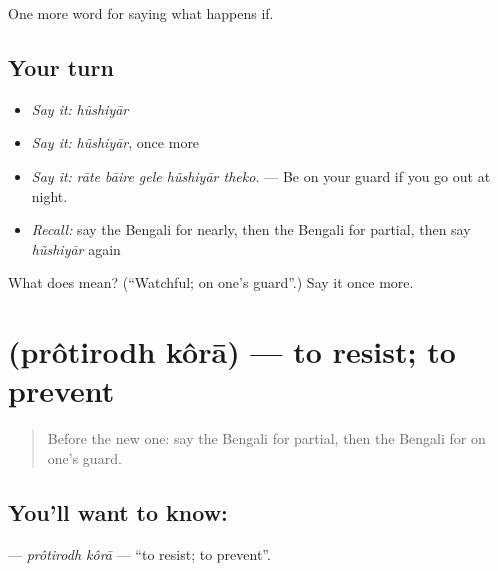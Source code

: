 \begin{grammarlens}[title={What you've built}]
One more word for saying what happens if.
\end{grammarlens}

\subsection*{Your turn}
\begin{itemize}
\raggedright
  \item \emph{Say it:} \emph{hũshiyār}
  \item \emph{Say it:} \emph{hũshiyār}, once more
  \item \emph{Say it:} \emph{rāte bāire gele hũshiyār theko.} — Be on your guard if you go out at night.
  \item \emph{Recall:} say the Bengali for nearly, then the Bengali for partial, then say \emph{hũshiyār} again
\end{itemize}

\begin{tcolorbox}[breakable,colback=teal!4,colframe=teal!35!black,title={Before you move on}]
What does  mean? (\textquotedblleft{}Watchful; on one's guard\textquotedblright{}.) Say it once more.
\end{tcolorbox}
\section[\texorpdfstring{\bn{প্রতিরোধ} \bn{করা} (prôtirodh kôrā)}{প্রতিরোধ করা (prôtirodh kôrā)}]{  (prôtirodh kôrā) — to resist; to prevent}

\label{lesson:BN-C374-protirodh-kora}



\begin{quote}
Before the new one: say the Bengali for partial, then the Bengali for on one's guard.
\end{quote}

\subsection*{You'll want to know:  }
\textbf{ } — \emph{prôtirodh kôrā} — \textquotedblleft{}to resist; to prevent\textquotedblright{}.

\begin{quote}
        
\end{quote}

